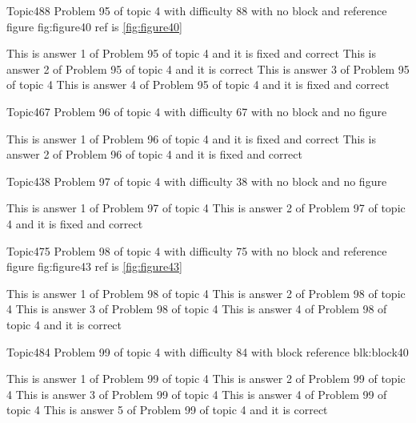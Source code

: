 \documentclass[master]{exam}
\begin{document}
\begin{problem}{Topic4}{88}
	Problem 95 of topic 4 with difficulty 88 with no block and reference figure fig:figure40 ref is \ref{fig:figure40}
	\begin{answers}
		 This is answer 1 of Problem 95 of topic 4 and it is fixed and correct
		\answer[correct] This is answer 2 of Problem 95 of topic 4 and it is correct
		\answer This is answer 3 of Problem 95 of topic 4 
		 This is answer 4 of Problem 95 of topic 4 and it is fixed and correct
	\end{answers}
\end{problem}

\begin{problem}{Topic4}{67}
	Problem 96 of topic 4 with difficulty 67 with no block and no figure
	\begin{answers}
		 This is answer 1 of Problem 96 of topic 4 and it is fixed and correct
		 This is answer 2 of Problem 96 of topic 4 and it is fixed and correct
	\end{answers}
\end{problem}

\begin{problem}{Topic4}{38}
	Problem 97 of topic 4 with difficulty 38 with no block and no figure
	\begin{answers}
		\answer This is answer 1 of Problem 97 of topic 4 
		 This is answer 2 of Problem 97 of topic 4 and it is fixed and correct
	\end{answers}
\end{problem}

\begin{problem}{Topic4}{75}
	Problem 98 of topic 4 with difficulty 75 with no block and reference figure fig:figure43 ref is \ref{fig:figure43}
	\begin{answers}
		\answer This is answer 1 of Problem 98 of topic 4 
		\answer This is answer 2 of Problem 98 of topic 4 
		\answer This is answer 3 of Problem 98 of topic 4 
		\answer[correct] This is answer 4 of Problem 98 of topic 4 and it is correct
	\end{answers}
\end{problem}

\begin{problem}[requires=blk:block40]{Topic4}{84}
	Problem 99 of topic 4 with difficulty 84 with block reference blk:block40
	\begin{answers}
		\answer This is answer 1 of Problem 99 of topic 4 
		\answer This is answer 2 of Problem 99 of topic 4 
		\answer This is answer 3 of Problem 99 of topic 4 
		\answer This is answer 4 of Problem 99 of topic 4 
		\answer[correct] This is answer 5 of Problem 99 of topic 4 and it is correct
	\end{answers}
\end{problem}
\end{document}
